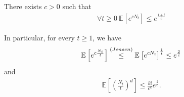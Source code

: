 \begin{prop}[]
	There exists $c> 0$ such that
	\begin{align}
		\forall t\geq 0\ \mathbb{E}_{} \left[ e^{cN_t} \right] \leq e^{\frac{1+t}{c}}
	\end{align}
\end{prop}
\begin{rmk}[]
	In particular, for every $t \geq 1$, we have 
	\begin{align}
		\mathbb{E}_{} \left[ e^{c \frac{N_t}{t}} \right] \stackrel{\textrm(Jensen)}{\leq} \mathbb{E}_{} \left[ e^{cN_t} \right]^{\frac{1}{t}} \leq e^{\frac{2}{c}}	
	\end{align}
and
\begin{align}
	\mathbb{E}_{} \left[ \left( \frac{N_t}{t}\right)^d \right] \leq \frac{k!}{c^k}e^{\frac{2}{c}}.
\end{align}
\end{rmk}
